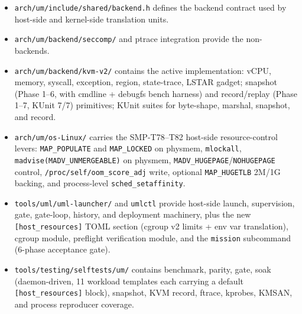 \begin{itemize}
  \item \texttt{arch/um/include/shared/backend.h} defines the backend
        contract used by host-side and kernel-side translation units.
  \item \texttt{arch/um/backend/seccomp/} and ptrace integration
        provide the non-\KVM{} backends.
  \item \texttt{arch/um/backend/kvm-v2/} contains the active \KVMvTwo{}
        implementation: vCPU, memory, syscall, exception, region,
        state-trace, LSTAR gadget; snapshot (Phase 1--6, with
        cmdline + debugfs bench harness) and record/replay
        (Phase 1--7, KUnit 7/7) primitives; KUnit suites for byte-shape,
        marshal, snapshot, and record.
  \item \texttt{arch/um/os-Linux/} carries the SMP-T78--T82 host-side
        resource-control levers: \texttt{MAP\_POPULATE} and
        \texttt{MAP\_LOCKED} on physmem, \texttt{mlockall},
        \texttt{madvise(MADV\_UNMERGEABLE)} on physmem,
        \texttt{MADV\_HUGEPAGE}/\texttt{NOHUGEPAGE} control,
        \texttt{/proc/self/oom\_score\_adj} write, optional
        \texttt{MAP\_HUGETLB} 2M/1G backing, and process-level
        \texttt{sched\_setaffinity}.
  \item \texttt{tools/uml/uml-launcher/} and \texttt{umlctl} provide
        host-side launch, supervision, gate, gate-loop, history, and
        deployment machinery, plus the new \texttt{[host\_resources]}
        TOML section (cgroup v2 limits + env var translation),
        cgroup module, preflight verification module, and the
        \texttt{mission} subcommand (6-phase acceptance gate).
  \item \texttt{tools/testing/selftests/um/} contains benchmark,
        parity, gate, soak (daemon-driven, 11 workload templates each
        carrying a default \texttt{[host\_resources]} block),
        snapshot, KVM record, ftrace, kprobes, KMSAN, and process
        reproducer coverage.
\end{itemize}

